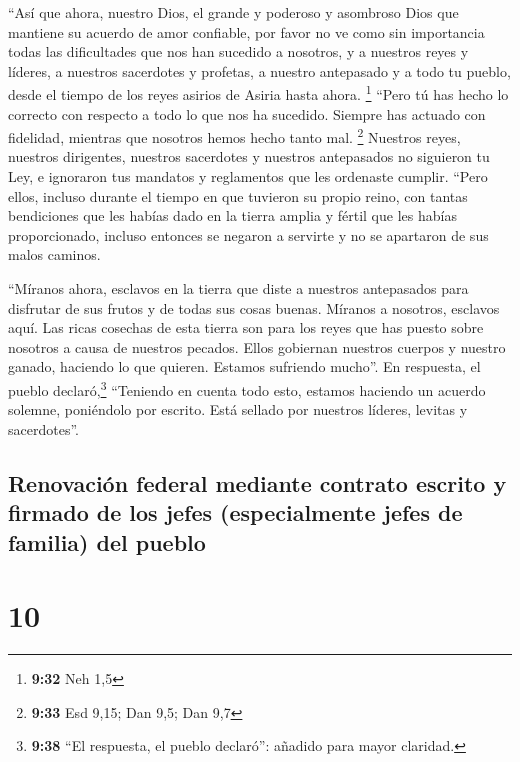  ``Así que ahora, nuestro Dios, el grande y poderoso y
asombroso Dios que mantiene su acuerdo de amor confiable, por favor no
ve como sin importancia todas las dificultades que nos han sucedido a
nosotros, y a nuestros reyes y líderes, a nuestros sacerdotes y
profetas, a nuestro antepasado y a todo tu pueblo, desde el tiempo de
los reyes asirios de Asiria hasta ahora. \footnote{\textbf{9:32} Neh 1,5}
 ``Pero tú has hecho lo correcto con respecto a todo lo
que nos ha sucedido. Siempre has actuado con fidelidad, mientras que
nosotros hemos hecho tanto mal. \footnote{\textbf{9:33} Esd 9,15; Dan
  9,5; Dan 9,7}  Nuestros reyes, nuestros dirigentes,
nuestros sacerdotes y nuestros antepasados no siguieron tu Ley, e
ignoraron tus mandatos y reglamentos que les ordenaste cumplir.
 ``Pero ellos, incluso durante el tiempo en que tuvieron
su propio reino, con tantas bendiciones que les habías dado en la tierra
amplia y fértil que les habías proporcionado, incluso entonces se
negaron a servirte y no se apartaron de sus malos caminos.

 ``Míranos ahora, esclavos en la tierra que diste a
nuestros antepasados para disfrutar de sus frutos y de todas sus cosas
buenas. Míranos a nosotros, esclavos aquí.  Las ricas
cosechas de esta tierra son para los reyes que has puesto sobre nosotros
a causa de nuestros pecados. Ellos gobiernan nuestros cuerpos y nuestro
ganado, haciendo lo que quieren. Estamos sufriendo mucho''.
 En respuesta, el pueblo declaró,\footnote{\textbf{9:38}
  ``El respuesta, el pueblo declaró'': añadido para mayor claridad.}
``Teniendo en cuenta todo esto, estamos haciendo un acuerdo solemne,
poniéndolo por escrito. Está sellado por nuestros líderes, levitas y
sacerdotes''.

\hypertarget{renovaciuxf3n-federal-mediante-contrato-escrito-y-firmado-de-los-jefes-especialmente-jefes-de-familia-del-pueblo}{%
\subsection{Renovación federal mediante contrato escrito y firmado de
los jefes (especialmente jefes de familia) del
pueblo}\label{renovaciuxf3n-federal-mediante-contrato-escrito-y-firmado-de-los-jefes-especialmente-jefes-de-familia-del-pueblo}}

\hypertarget{section-9}{%
\section{10}\label{section-9}}

